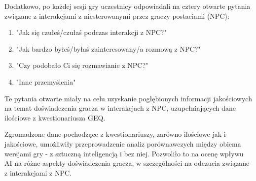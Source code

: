 Dodatkowo, po każdej sesji gry uczestnicy odpowiadali na cztery otwarte pytania związane z
interakcjami z niesterowanymi przez graczy postaciami (NPC):

\begin{enumerate}
    \item "Jak się czułeś/czułaś podczas interakcji z NPC?"
    \item "Jak bardzo byłeś/byłaś zainteresowany/a rozmową z NPC?"
    \item "Czy podobało Ci się rozmawianie z NPC?"
    \item "Inne przemyślenia"
\end{enumerate}

Te pytania otwarte miały na celu uzyskanie pogłębionych informacji jakościowych na temat
doświadczenia gracza w interakcjach z NPC, uzupełniających dane ilościowe z kwestionariusza GEQ.

Zgromadzone dane pochodzące z kwestionariuszy, zarówno ilościowe jak i jakościowe, umożliwiły
przeprowadzenie analiz porównawczych między obiema wersjami gry - z sztuczną inteligencją i bez
niej. Pozwoliło to na ocenę wpływu AI na różne aspekty doświadczenia gracza, w szczególności na
odczucia związane z interakcjami z NPC.